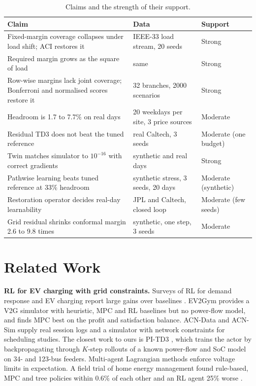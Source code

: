 \documentclass[11pt]{article}
\begin{document}
\begin{table}[h]\centering\small
\begin{tabular}{L{6.0cm}L{4.4cm}L{3.6cm}}\toprule
Claim & Data & Support\\\midrule
Fixed-margin coverage collapses under load shift; ACI restores it & IEEE-33 load stream, 20 seeds & Strong\\
Required margin grows as the square of load & same & Strong\\
Row-wise margins lack joint coverage; Bonferroni and normalised scores restore it & 32 branches, 2000 scenarios & Strong\\
Headroom is 1.7 to 7.7\% on real days & 20 weekdays per site, 3 price sources & Moderate\\
Residual TD3 does not beat the tuned reference & real Caltech, 3 seeds & Moderate (one budget)\\
Twin matches simulator to $10^{-16}$ with correct gradients & synthetic and real days & Strong\\
Pathwise learning beats tuned reference at 33\% headroom & synthetic stress, 3 seeds, 20 days & Moderate (synthetic)\\
Restoration operator decides real-day learnability & JPL and Caltech, closed loop & Moderate (few seeds)\\
Grid residual shrinks conformal margin 2.6 to 9.8 times & synthetic, one step, 3 seeds & Moderate\\\bottomrule
\end{tabular}\caption{Claims and the strength of their support.}\label{tab:status}\end{table}

\section{Related Work}
\textbf{RL for EV charging with grid constraints.} Surveys of RL for demand response and EV charging report large gains over baselines \cite{vazquez}. EV2Gym \cite{ev2gym} provides a V2G simulator with heuristic, MPC and RL baselines but no power-flow model, and finds MPC best on the profit and satisfaction balance. ACN-Data and ACN-Sim \cite{acn,acnsim} supply real session logs and a simulator with network constraints for scheduling studies. The closest work to ours is PI-TD3 \cite{pitd3}, which trains the actor by backpropagating through $K$-step rollouts of a known power-flow and SoC model on 34- and 123-bus feeders. Multi-agent Lagrangian methods \cite{tlmappo} enforce voltage limits in expectation. A field trial of home energy management found rule-based, MPC and tree policies within 0.6\% of each other and an RL agent 25\% worse \cite{ruddick}.
\end{document}
